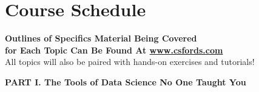 \documentclass[12pt]{article}
\begin{document}
%
%
%
%
%
%
%
%
%

\section{Course Schedule}

\begin{center}
	\textbf{Outlines of Specifics Material Being Covered \\
	for Each Topic Can Be Found At \href{www.csfords.com}{www.csfords.com}} \\
	All topics will also be paired with hands-on exercises and tutorials!
\end{center}

\vspace{.4in}
\begin{center}
	\textbf{PART I. The Tools of Data Science No One Taught You}
\end{center}
\vspace{.2in}
\end{document}
